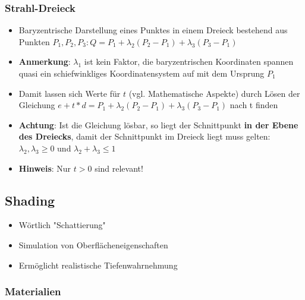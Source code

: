 \documentclass[10pt,a4paper]{article}
\begin{document}
	\subsubsection{Strahl-Dreieck}
	\label{ssub:strahl_dreieck}
	
	\begin{itemize}
		\item Baryzentrische Darstellung eines Punktes in einem Dreieck bestehend aus Punkten $P_1, P_2, P_3: Q = P_1 + \lambda_2(P_2 - P_1) + \lambda_3(P_3 - P_1)$
		\item \textbf{Anmerkung}: $\lambda_1$ ist kein Faktor, die baryzentrischen Koordinaten spannen quasi ein schiefwinkliges Koordinatensystem auf mit dem Ursprung $P_1$
		\item Damit lassen sich Werte für $t$ (vgl. Mathematische Aspekte) durch Lösen der Gleichung $e + t * d = P_1 + \lambda_2(P_2 - P_1) + \lambda_3(P_3 - P_1)$ nach t finden
		\item \textbf{Achtung}: Ist die Gleichung lösbar, so liegt der Schnittpunkt \textbf{in der Ebene des Dreiecks}, damit der Schnittpunkt im Dreieck liegt muss gelten: $\lambda_2, \lambda_3 \geq 0$ und $\lambda_2 + \lambda_3 \leq 1$
		\item \textbf{Hinweis}: Nur $t > 0$ sind relevant!
	\end{itemize}

	\subsection{Shading}
	\label{sub:shading}

	\begin{itemize}
		\item Wörtlich "Schattierung"
		\item Simulation von Oberflächeneigenschaften
		\item Ermöglicht realistische Tiefenwahrnehmung
	\end{itemize}

	\subsubsection{Materialien}
	\label{ssub:materialien}
\end{document}
